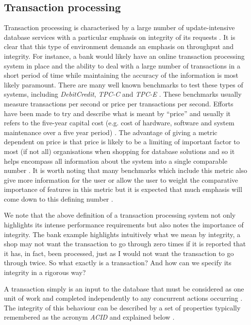 \subsection{Transaction processing}
Transaction processing is characterised by a large number of
update-intensive database services with a particular emphasis on integrity of
its requests \cite{PractitionersIntroduction}.
It is clear that this type of environment
demands an emphasis on throughput and integrity. For instance, a bank would
likely have an online transaction processing system in place and the
ability to deal with a large number of transactions in a short period of
time while maintaining the accuracy of the information is most likely paramount.
There are many well known benchmarks to test these types of systems,
including \emph{DebitCredit}, \emph{TPC-C} and \emph{TPC-E} \cite{DebitCredit,
TPC-OLTP}.
These benchmarks usually measure transactions per second or price per
transactions per second. Efforts have been made to try and describe what is
meant by ``price'' and usually it refers to the five-year capital cost (e.g.
cost of hardware, software and system maintenance over a five year period)
\cite{BenchmarkHandbook, DebitCredit}. The advantage of giving a metric
dependent on price is that price is likely to be a limiting of important factor
to most (if not all) organisations when shopping for database solutions and so
it helps encompass all information about the system into a single comparable
number \cite{SetQueryBenchmark}. It is worth noting that many benchmarks which
include this metric also give more information for the user \cite{TPC-H} or
allow the user to weight the comparative importance of features in this metric
\cite{SetQueryBenchmark} but it is expected that much emphasis will come down to
this defining number \cite{SetQueryBenchmark}.

We note that the above definition of a transaction processing system not only
highlights its intense performance requirements but also notes the importance of
integrity. The bank example highlights intuitively what we mean by integrity, a
shop may not want the transaction to go through zero times if it is reported
that it has, in fact, been processed, just as I would not want the transaction
to go through twice. So what exactly is a transaction? And how can we specify
its integrity in a rigorous way?

A transaction simply is an input to the database that must be considered as one
unit of work \cite{ComputerScienceDictionary} and completed independently to any
concurrent actions occurring \cite{ACID}. The integrity of this behaviour can be described 
by a set of properties typically remembered as the acronym \emph{ACID} and
explained below \cite{ACID, PractitionersIntroduction}.

